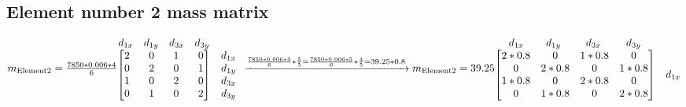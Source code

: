 \documentclass{article}
\begin{document}
\subsection{Element number 2 mass matrix}
    \begin{math}
    m_{\text{Element2}}=\frac{7850*0.006*4}{6}
        \begin{matrix}
            \begin{matrix}
            d_{1x}&d_{1y}&d_{3x}&d_{3y}\\
            \end{matrix}\\
            \begin{bmatrix}
            2&\;\;\;0&\;\;\;1&\;\;\;0\\
            0&\;\;\;2&\;\;\;0&\;\;\;1\\
            1&\;\;\;0&\;\;\;2&\;\;\;0\\
            0&\;\;\;1&\;\;\;0&\;\;\;2\\
            \end{bmatrix}&
            \begin{matrix}
            d_{1x}\\
            d_{1y}\\
            d_{3x}\\
            d_{3y}\\
            \end{matrix}
        \end{matrix}
        \newline
        \xrightarrow{\frac{7850*0.006*4}{6}*\frac{5}{5}=\frac{7850*0.006*5}{6}*\frac{4}{5}=39.25*0.8}m_{\text{Element2}}=39.25
        \begin{matrix}
            \begin{matrix}
            d_{1x}&\;\;\;\;d_{1y}&\;\;\;\;\;d_{3x}&\;\;\;\;\;d_{3y}\\
            \end{matrix}\\
            \begin{bmatrix}
            2*0.8&0    &1*0.8&0    \\
            0    &2*0.8&0    &1*0.8\\
            1*0.8&0    &2*0.8&0    \\
            0    &1*0.8&0    &2*0.8\\
            \end{bmatrix}&
            \begin{matrix}
            d_{1x}\\

\end{matrix}
\end{matrix}
\end{math}
\end{document}
